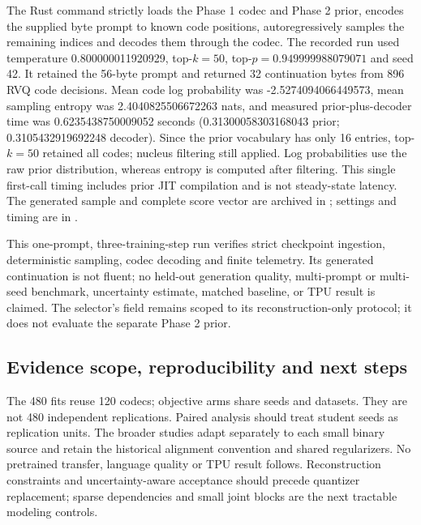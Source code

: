 The Rust  command strictly loads the
Phase 1 codec and Phase 2 prior, encodes the supplied byte prompt to known code
positions, autoregressively samples the remaining indices and decodes them
through the codec. The recorded run used temperature 0.800000011920929,
top-$k=50$, top-$p=0.949999988079071$ and seed 42. It retained the 56-byte
prompt and returned 32 continuation bytes from 896 RVQ code decisions. Mean
code log probability was -2.5274094066449573, mean sampling entropy was
2.4040825506672263 nats, and measured prior-plus-decoder time was
0.6235438750009052 seconds (0.31300058303168043 prior; 0.3105432919692248
decoder). Since the prior vocabulary has only 16 entries, top-$k=50$ retained
all codes; nucleus filtering still applied. Log probabilities use the raw prior
distribution, whereas entropy is computed after filtering. This single
first-call timing includes prior JIT compilation and is not steady-state
latency. The generated sample and complete score vector are archived in
; settings and timing are in
.

This one-prompt, three-training-step run verifies strict checkpoint ingestion,
deterministic sampling, codec decoding and finite telemetry. Its generated
continuation is not fluent; no held-out generation quality, multi-prompt or
multi-seed benchmark, uncertainty estimate, matched baseline, or TPU result is
claimed. The selector's  field remains scoped to its
reconstruction-only protocol; it does not evaluate the separate Phase 2 prior.

\subsection{Evidence scope, reproducibility and next steps}
The 480 fits reuse 120 codecs; objective arms share seeds and datasets. They
are not 480 independent replications. Paired analysis should treat student
seeds as replication units. The broader studies adapt separately to each
small binary source and retain the historical alignment convention and shared
regularizers. No pretrained transfer, language quality or TPU result follows.
Reconstruction constraints and uncertainty-aware acceptance should precede
quantizer replacement; sparse dependencies and small joint blocks are the
next tractable modeling controls.

